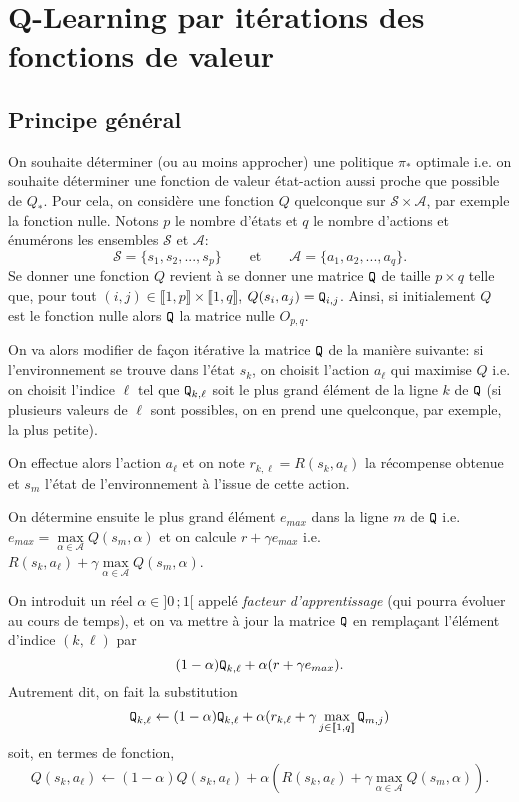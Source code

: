 \chapter{Q-Learning par itérations des fonctions de valeur}
\section{Principe général}

On souhaite déterminer (ou au moins approcher) une politique $\pi_*$ optimale i.e. on souhaite déterminer une fonction de valeur état-action aussi proche que possible de $Q_*$. Pour cela, on considère une fonction $Q$ quelconque sur $\mathcal{S}\times\mathcal{A}$, par exemple la fonction nulle. Notons $p$ le nombre d'états et $q$ le nombre d'actions et énumérons les ensembles $\mathcal{S}$ et $\mathcal{A}$:
$$\mathcal{S}=\{s_1, s_2, ..., s_{p}\} \qquad \text{et} \qquad \mathcal{A}=\{a_1, a_2, ..., a_{q}\}.$$
Se donner une fonction $Q$ revient à se donner une matrice $\verb|Q|$ de taille $p\times q$ telle que, pour tout $(i,j)\in\llbracket 1, p\rrbracket \times \llbracket 1, q\rrbracket$, $Q(s_i, a_j)=\verb|Q|_{i,j}$. Ainsi, si initialement $Q$ est le fonction nulle alors $\verb|Q|$ la matrice nulle $O_{p,q}$.

On va alors modifier de façon itérative la matrice $\verb|Q|$ de la manière suivante: si l'environnement se trouve dans l'état $s_k$, on choisit l'action $a_{\ell}$ qui maximise $Q$ i.e. on choisit l'indice $\ell$ tel que $\verb|Q|_{k,\ell}$ soit le plus grand élément de la ligne $k$ de $\verb|Q|$ (si plusieurs valeurs de $\ell$ sont possibles, on en prend une quelconque, par exemple, la plus petite).

On effectue alors l'action $a_{\ell}$ et on note $r_{k,\ell}=R(s_k, a_{\ell})$ la récompense obtenue et $s_m$ l'état de l'environnement à l'issue de cette action. 

On détermine ensuite le plus grand élément $e_{max}$ dans la ligne $m$ de $\verb|Q|$ i.e. $e_{max}=\mathop{\max}\limits_{\alpha\in\mathcal{A}} Q(s_{m}, \alpha)$ et on calcule $r+\gamma e_{max}$ i.e. $R(s_k, a_{\ell})+\gamma \mathop{\max}\limits_{\alpha\in\mathcal{A}} Q(s_{m},\alpha)$.

On introduit un réel $\alpha\in]0\,;1[$ appelé \textit{facteur d'apprentissage} (qui pourra évoluer au cours de temps), et on va mettre à jour la matrice $\verb|Q|$ en remplaçant l'élément d'indice $(k, \ell)$ par
$$(1-\alpha)\verb|Q|_{k, \ell} + \alpha(r+\gamma e_{max}).$$
Autrement dit, on fait la substitution
$$\verb|Q|_{k,\ell} \leftarrow (1-\alpha)\verb|Q|_{k,\ell} + \alpha(r_{k,\ell}+\gamma \mathop{\max}\limits_{j\in\llbracket 1, q\rrbracket} \verb|Q|_{m,j})$$
soit, en termes de fonction,
$$Q(s_k, a_{\ell}) \leftarrow (1-\alpha)Q(s_k, a_{\ell}) + \alpha(R(s_k, a_{\ell})+\gamma \mathop{\max}\limits_{\alpha\in\mathcal{A}} Q(s_{m},\alpha)).$$


